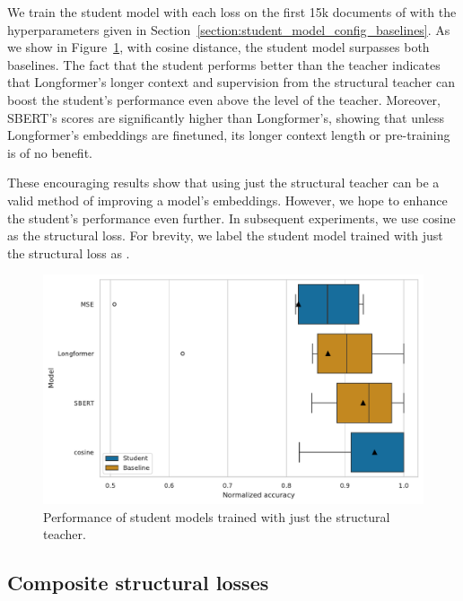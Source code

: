We train the student model with each loss on the first 15k documents of
 with the hyperparameters given in
Section~\ref{section:student_model_config_baselines}. As we show in
Figure~\ref{fig:structural_basic}, with cosine distance, the student model
surpasses both baselines. The fact that the student performs better
than the teacher indicates that Longformer's longer context and supervision from
the structural teacher can boost the student's performance even above the level
of the teacher. Moreover, SBERT's scores are significantly higher than
Longformer's, showing that unless Longformer's embeddings are finetuned, its
longer context length or pre-training is of no benefit.

These encouraging results show that using just the structural teacher can be a
valid method of improving a model's embeddings. However, we hope to
enhance the student's performance even further. In subsequent experiments, we
use cosine as the structural loss. For brevity, we label the student model
trained with just the structural loss as .

\begin{figure}
  \includegraphics[width=\textwidth]{img/structural_simple_losses.pdf}

  \caption{Performance of student models trained with just the structural
  teacher.}

  \label{fig:structural_basic}
\end{figure}

\subsection{Composite structural losses}\label{section:composite_losses}


